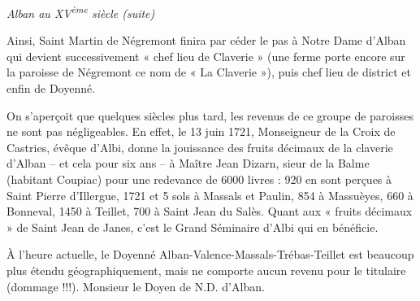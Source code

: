 \begin{center}
    {\Large\itshape Alban au XV\textsuperscript{ème} siècle (suite)}
\end{center}

\bigskip

Ainsi, Saint Martin de Négremont finira par céder le pas à Notre Dame d'Alban qui devient successivement « chef lieu de Claverie » (une ferme porte encore sur la paroisse de Négremont ce nom de « La Claverie »), puis chef lieu de district et enfin de Doyenné.

On s'aperçoit que quelques siècles plus tard, les revenus de ce groupe de paroisses ne sont pas négligeables. En effet, le 13 juin 1721, Monseigneur de la Croix de Castries, évêque d'Albi, donne la jouissance des fruits décimaux de la claverie d'Alban -- et cela pour six ans -- à Maître Jean Dizarn, sieur de la Balme (habitant Coupiac) pour une redevance de 6000 livres : 920 en sont perçues à Saint Pierre d'Illergue, 1721 et 5 sols à Massals et Paulin, 854 à Massuèyes, 660 à Bonneval, 1450 à Teillet, 700 à Saint Jean du Salès. Quant aux « fruits décimaux » de Saint Jean de Janes, c'est le Grand Séminaire d'Albi qui en bénéficie.

À l'heure actuelle, le Doyenné Alban-Valence-Massals-Trébas-Teillet est beaucoup plus étendu géographiquement, mais ne comporte aucun revenu pour le titulaire (dommage !!!). Monsieur le Doyen de N.D. d'Alban.
